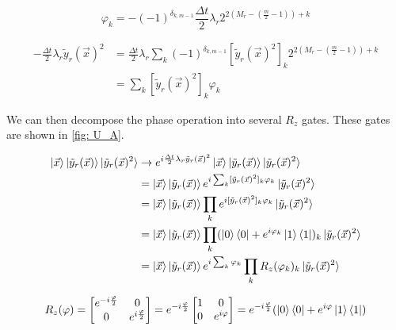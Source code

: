 \begin{equation}
    \varphi_k = -(-1)^{\delta_{k, m - 1}}\frac{\Delta t}{2}\lambda_r2^{2(M_r - (\frac{m}{2} - 1)) + k}
\end{equation}

\begin{equation}
    \begin{split}
        -\frac{\Delta t}{2}\lambda_r\tilde{y}_r(\vec{x})^2 &= \frac{\Delta t}{2}\lambda_r\sum_k (-1)^{\delta_{k, m - 1}}[\tilde{y}_r(\vec{x})^2]_k2^{2(M_r - (\frac{m}{2} - 1)) + k} \\
        &= \sum_k [\tilde{y}_r(\vec{x})^2]_k\varphi_k
    \end{split}
\end{equation}

We can then decompose the phase operation into several $R_z$ gates. These gates are shown in \ref{fig: U_A}.

\begin{equation}
    \begin{split}
        \ket{\vec{x}}\ket{\tilde{y}_r(\vec{x})}\ket{\tilde{y}_r(\vec{x})^2} &\rightarrow e^{i\frac{\Delta t}{2}\lambda_r\tilde{y}_r(\vec{x})^2}\ket{\vec{x}}\ket{\tilde{y}_r(\vec{x})}\ket{\tilde{y}_r(\vec{x})^2} \\
        &= \ket{\vec{x}}\ket{\tilde{y}_r(\vec{x})}e^{i\sum_k [\tilde{y}_r(\vec{x})^2]_k\varphi_k}\ket{\tilde{y}_r(\vec{x})^2} \\
        &= \ket{\vec{x}}\ket{\tilde{y}_r(\vec{x})}\prod_k e^{i[\tilde{y}_r(\vec{x})^2]_k\varphi_k}\ket{\tilde{y}_r(\vec{x})^2} \\
        &= \ket{\vec{x}}\ket{\tilde{y}_r(\vec{x})}\prod_k (\ket{0}\bra{0} + e^{i\varphi_k}\ket{1}\bra{1})_k \ket{\tilde{y}_r(\vec{x})^2} \\
        &= \ket{\vec{x}}\ket{\tilde{y}_r(\vec{x})}e^{i\sum_k \varphi_k}\prod_k R_z(\varphi_k)_k \ket{\tilde{y}_r(\vec{x})^2}
    \end{split}
\end{equation}

\begin{equation}
    R_z(\varphi) = \begin{bmatrix}
        e^{-i\frac{\varphi}{2}} & 0 \\ 0 & e^{i\frac{\varphi}{2}}
    \end{bmatrix} = e^{-i\frac{\varphi}{2}}\begin{bmatrix}
        1 & 0 \\ 0 & e^{i\varphi}
    \end{bmatrix} = e^{-i\frac{\varphi}{2}}(\ket{0}\bra{0} + e^{i\varphi}\ket{1}\bra{1})
\end{equation}


